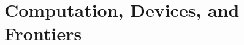 \documentclass[11pt,a4paper,openany]{book}
\newif\ifQiushiHasCitations
\theoremstyle{bookplain}
\theoremstyle{bookdefinition}
\theoremstyle{remark}
\begin{document}
\part{Computation, Devices, and Frontiers}





\appendix






\backmatter
\ifQiushiHasCitations
  \IfFileExists{refs.bib}{
    
    
  }{}
\fi
\end{document}
